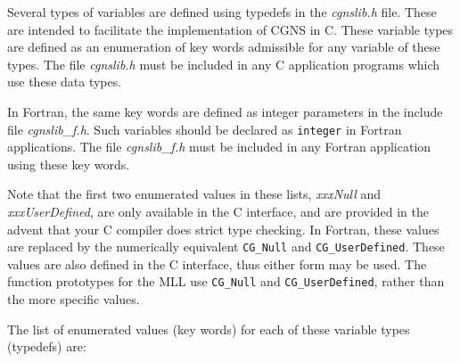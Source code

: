 Several types of variables are defined using typedefs in the
\textit{cgnslib.h} file.
These are intended to facilitate the implementation of
CGNS in C.
These variable types are defined as an enumeration of key
words admissible for any variable of these types.
The file \textit{cgnslib.h} must be included in any C application
programs which use these data types.

In Fortran, the same key words are defined as integer parameters in the
include file \textit{cgnslib\_f.h}.
Such variables should be declared as \texttt{integer} in Fortran
applications.
The file \textit{cgnslib\_f.h} must be included in any
Fortran application using these key words.

Note that the first two enumerated values in these lists,
\textit{xxxNull} and \textit{xxxUserDefined}, are only available
in the C interface, and are provided in the advent that your
C compiler does strict type checking. In Fortran, these values
are replaced by the numerically equivalent \texttt{CG\_Null}
and \texttt{CG\_UserDefined}. These values are also defined in the
C interface, thus either form may be used. The function prototypes
for the MLL use \texttt{CG\_Null} and \texttt{CG\_UserDefined},
rather than the more specific values.

The list of enumerated values (key words) for each of these variable
types (typedefs) are:
        
